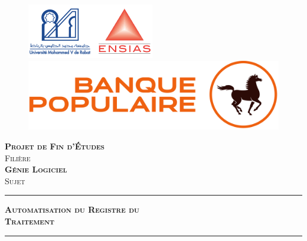 \begin{titlepage}\label{TitlePäge}
\begin{center}
    \begin{figure}[!htb]
        \begin{minipage}{0.5\linewidth}
            \includegraphics[width=0.58\linewidth]{logos/Um5-ENSIAS.png}
        \end{minipage}
        \hspace{1.8cm}
        \begin{minipage}{0.5\linewidth}
            \includegraphics[width=0.84\linewidth]{logos/BCP.png}
        \end{minipage}
    \end{figure}
     
   \vspace*{1.6cm}

  \textsc{\huge \bfseries Projet de Fin d'Études}\\[1.3cm]
  \textsc{\small Filière}\\[1cm]
  \textsc{\huge \bfseries Génie Logiciel }\\[1.4cm]
  \textsc{\small Sujet}\\
  \begin{center}
 \rule{0.5\linewidth}{1pt}
 \end{center}
  \textsc{\huge \bfseries Automatisation du Registre du \\\vspace*{0.5cm} Traitement}
  \begin{center}
 \rule{0.5\linewidth}{1pt}
 \end{center}
 
 \vspace{2.8cm}
  

\end{center}
\end{titlepage}
